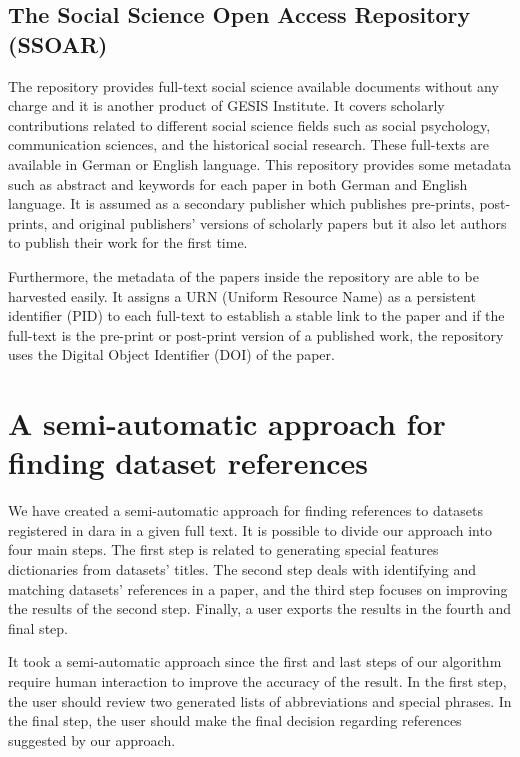 \documentclass{IOS-Book-Article}
\newcommand{\dara}{\textsf{da\textbar ra}}
\begin{document}
\subsection{The Social Science Open Access Repository (SSOAR)}
The repository provides full-text social science available documents without any charge and it is another product of GESIS Institute. It covers scholarly contributions related to different social science fields such as social psychology, communication sciences, and the historical social research. These full-texts are available in German or English language.
This repository provides some metadata such as abstract and keywords for each paper in both German and English language. It is assumed as a secondary publisher which publishes pre-prints, post-prints, and original publishers' versions of scholarly papers but it also let authors to publish their work for the first time.

Furthermore, the metadata of the papers inside the repository are able to be harvested easily. 
It assigns a URN (Uniform Resource Name) as a persistent identifier (PID) to each full-text to establish a stable link to the paper and if the full-text is the pre-print or post-print version of a published work, the repository uses the Digital Object Identifier (DOI) of the paper.

\section{A semi-automatic approach for finding dataset references}
\label{sec:approach}
We have created a semi-automatic approach for finding references to datasets registered in {\dara} in a given full text. 
It is possible to divide our approach into four main steps. The first step is related to generating special features dictionaries from datasets' titles. The second step deals with identifying and matching datasets' references in a paper, and the third step focuses on improving the results of the second step. Finally, a user exports the results in the fourth and final step.

It took a semi-automatic approach since 
the first and last steps of our algorithm require human interaction to improve the accuracy of the result. 
In the first step, the user should review two generated lists of abbreviations and special phrases. In the final step, the user should make the final decision regarding references suggested by our approach.
\end{document}
